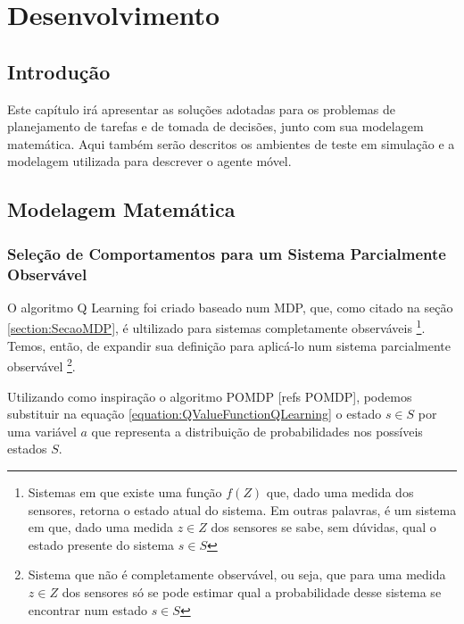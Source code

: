 


\chapter{Desenvolvimento\label{chap:Desenvolvimento}}


\section{Introdução}

Este capítulo irá apresentar as soluções adotadas para os problemas de planejamento de tarefas e de tomada de decisões, junto com sua modelagem matemática. Aqui também serão descritos os ambientes de teste em simulação e a modelagem utilizada para descrever o agente móvel.

\section{Modelagem Matemática}

\subsection{Seleção de Comportamentos para um Sistema Parcialmente Observável} \label{subsection:SelecaoDeComportamento}

O algoritmo Q Learning foi criado baseado num MDP, que, como citado na seção \ref{section:SecaoMDP}, é ultilizado para sistemas completamente observáveis%
\footnote{Sistemas em que existe uma função $ f \left( Z \right) $ que, dado uma medida dos sensores, retorna o estado atual do sistema. Em outras palavras, é um sistema em que, dado uma medida $ z \in Z $ dos sensores se sabe, sem dúvidas, qual o estado presente do sistema $ s \in S $%
}. Temos, então, de expandir sua definição para aplicá-lo num sistema parcialmente observável%
\footnote{Sistema que não é completamente observável, ou seja, que para uma medida $ z \in Z $ dos sensores só se pode estimar qual a probabilidade desse sistema se encontrar num estado $ s \in S $%
}.

Utilizando como inspiração o algoritmo POMDP [refs POMDP], podemos substituir na equação \ref{equation:QValueFunctionQLearning} o estado $ s \in S $ por uma variável $ a $ que representa a distribuição de probabilidades nos possíveis estados $ S $.

